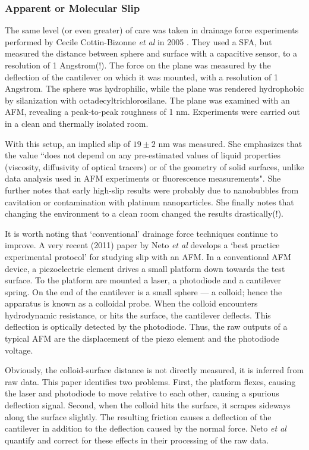 \documentclass[12pt, a4paper, twoside, openright]{book}
\begin{document}
\subsubsection*{Apparent or Molecular Slip}

The same level (or even greater) of care was taken in drainage force experiments performed by Cecile Cottin-Bizonne \emph{et al} in 2005 \cite{Cottin-Bizonne2005}. They used a SFA, but measured the distance between sphere and surface with a capacitive sensor, to a resolution of 1 Angstrom(!). The force on the plane was measured by the deflection of the cantilever on which it was mounted, with a resolution of 1 Angstrom.  The sphere was hydrophilic, while the plane was rendered hydrophobic by silanization with octadecyltrichlorosilane. The plane was examined with an AFM, revealing a peak-to-peak roughness of 1 nm.  Experiments were carried out in a clean and thermally isolated room.

With this setup, an implied slip of $19 \pm 2$ nm was measured. She emphasizes that the value ``does not depend on any pre-estimated values of liquid properties (viscosity, diffusivity of optical tracers) or of the geometry of solid surfaces, unlike data analysis used in AFM experiments or fluorescence measurements".  She further notes that early high-slip results were probably due to nanobubbles from cavitation or contamination with platinum nanoparticles. She finally notes that changing the environment to a clean room changed the results drastically(!).

\vspace{1em}
It is worth noting that `conventional' drainage force techniques continue to improve.  A very recent (2011) paper by Neto \emph{et al} \cite{ZhuAttardNeto2011} develops a `best practice experimental protocol' for studying slip with an AFM.  In a conventional AFM device, a piezoelectric element drives a small platform down towards the test surface.  To the platform are mounted a laser, a photodiode and a cantilever spring.  On the end of the cantilever is a small sphere --- a colloid; hence the apparatus is known as a colloidal probe.  When the colloid encounters hydrodynamic resistance, or hits the surface, the cantilever deflects.  This deflection is optically detected by the photodiode. Thus, the raw outputs of a typical AFM are the displacement of the piezo element and the photodiode voltage.

Obviously, the colloid-surface distance is not directly measured, it is inferred from raw data.  This paper identifies two problems. First, the platform flexes, causing the laser and photodiode to move relative to each other, causing a spurious deflection signal.  Second, when the colloid hits the surface, it scrapes sideways along the surface slightly.  The resulting friction causes a deflection of the cantilever in addition to the deflection caused by the normal force.  Neto \emph{et al} quantify and correct for these effects in their processing of the raw data.
\end{document}
